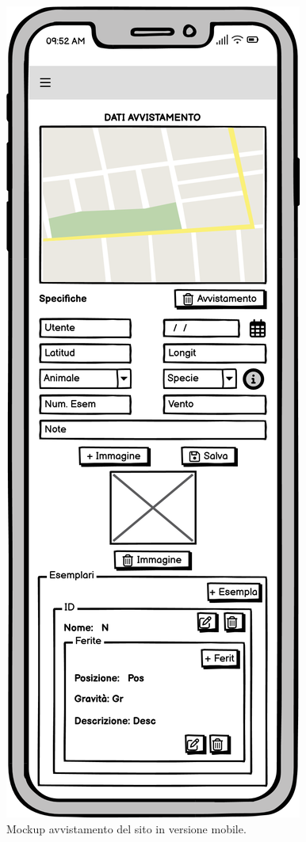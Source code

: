 \documentclass[a4paper,final,12pt]{report}
\begin{document}
\begin{figure}[hbtp]
\centering
\includegraphics[scale=0.50]{img_concettuale/avvistamentoMok.png}
\caption{Mockup avvistamento del sito in versione mobile.}
\label{figura:mobDesk}
\end{figure}
\end{document}
